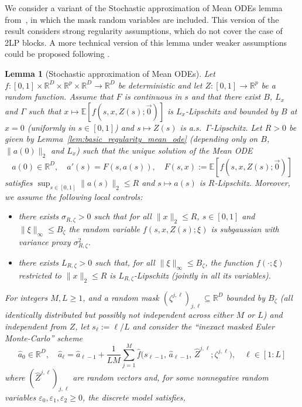 \documentclass[a4paper,11pt]{article}
\newcommand{\R}{\mathbb{R}}
\newcommand{\1}{\mathbbm{1}}
\newtheorem{lemma}[theorem]{Lemma}
\theoremstyle{definition}
\theoremstyle{remark}
\begin{document}
We consider a variant of the Stochastic approximation of Mean ODEs lemma from~\cite{chizat2025hidden}, in which the mask random variables are included. This version of the result considers strong regularity assumptions, which do not cover the case of 2LP blocks. A more technical version of this lemma under
weaker assumptions could be proposed following \cite[Lemma 6.4]{chizat2025hidden}.
\begin{lemma}[Stochastic approximation of Mean ODEs]\label{lem:stoch_approx}
Let {$f : [0,1] \times \R^D \times \R^p \times \R^{D}\to \R^{D}$} be deterministic and let
$Z : [0,1] \to \R^p$ be a random function. Assume that $F$ is continuous in $s$ and
that there exist $B$, $L_x$ and $\Gamma$ such that $x \mapsto \mathbb{E}[f(s,x,Z(s){;\vec{0}})]$
is $L_x$-Lipschitz and bounded by $B$ at $x = 0$ (uniformly in $s \in [0,1]$) and
$s \mapsto Z(s)$ is a.s.\ $\Gamma$-Lipschitz. Let $R > 0$ be given by Lemma~\ref{lem:basic_regularity_mean_ode}
(depending only on $B$, $\|a(0)\|_2$ and $L_x$) such that the unique solution of the
Mean ODE
\[
  a(0) \in \R^D, \quad
  a'(s) = F(s, a(s)), \quad
  F(s,x) := \mathbb{E}[f(s,x,Z(s){;\vec{0}})]
\]
satisfies $\sup_{s \in [0,1]} \|a(s)\|_2 \leq R$ and $s \mapsto a(s)$ is $R$-Lipschitz.
Moreover, we assume the following local controls:
\begin{itemize}
  \item there exists $\sigma_{R{,\zeta}} > 0$ such that for all $\|x\|_2 \leq R$, $s \in [0,1]$ {and $\|\xi\|_\infty \leq B_\zeta$}
        the random variable $f(s,x,Z(s){;\xi})$ is subgaussian with variance proxy
        $\sigma_{R{,\zeta}}^2$.
  \item there exists $L_{R{,\zeta}} > 0$ such that, {for all $\|\xi\|_{\infty}\leq B_\zeta$}, the function $f{(\cdot;\xi)}$ restricted to $\|x\|_2 \leq R$
        is $L_{R{,\zeta}}$-Lipschitz (jointly in all its variables).
\end{itemize}
For integers $M, L \geq 1$, and a random mask $(\zeta^{j,\ell})_{j,\ell}\subseteq\R^{{D}}$ {bounded by $B_\zeta$ (all identically distributed but possibly not independent across either $M$ or $L$)}
and independent from $Z$, let $s_\ell := \ell/L$ and consider the ``inexact masked Euler
Monte-Carlo'' scheme
\[
  \hat{a}_0 \in \R^D, \quad
  \hat{a}_\ell = \hat{a}_{\ell-1}
  + \frac{1}{LM} \sum_{j=1}^{M} \hat{f}\!\big(s_{\ell-1},\, \hat{a}_{\ell-1},\,
  \hat{Z}^{j,\ell}{; \zeta^{j,\ell}}\big), \quad \ell \in [1:L]
\]
where $(\hat{Z}^{j,\ell})_{j,\ell}$ are random vectors and, for some nonnegative random variables 
$\varepsilon_0, \varepsilon_1, \varepsilon_2 \geq 0$, the discrete model satisfies, 

\end{lemma}
\end{document}
